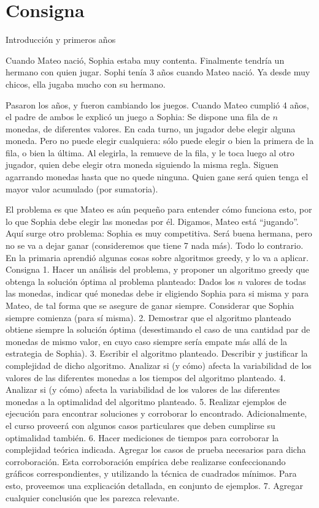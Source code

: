 \section*{Consigna}


{\huge Introducción y primeros años}
\vskip0.5cm

Cuando Mateo nació, Sophia estaba muy contenta. Finalmente tendría un hermano con quien jugar. Sophi tenía 3 años cuando Mateo nació. Ya desde muy chicos, ella jugaba mucho con su hermano.

Pasaron los años, y fueron cambiando los juegos. Cuando Mateo cumplió 4 años, el padre de ambos le explicó un juego a Sophia: Se dispone una fila de $n$ monedas, de diferentes valores. En cada turno, un jugador debe elegir alguna moneda. Pero no puede elegir cualquiera: sólo puede elegir o bien la primera de la fila, o bien la última. Al elegirla, la remueve de la fila, y le toca luego al otro jugador, quien debe elegir otra moneda siguiendo la misma regla. Siguen agarrando monedas hasta que no quede ninguna. Quien gane será quien tenga el mayor valor acumulado (por sumatoria).

El problema es que Mateo es aún pequeño para entender cómo funciona esto, por lo que Sophia debe elegir las monedas por él. Digamos, Mateo está “jugando”. Aquí surge otro problema: Sophia es muy competitiva. Será buena hermana, pero no se va a dejar ganar (consideremos que tiene 7 nada más). Todo lo contrario. En la primaria aprendió algunas cosas sobre algoritmos greedy, y lo va a aplicar.
\vskip0.5cm
{\huge Consigna}
\vskip0.5cm
1. Hacer un análisis del problema, y proponer un algoritmo greedy que obtenga la solución óptima al problema planteado: Dados los 
$n$ valores de todas las monedas, indicar qué monedas debe ir eligiendo Sophia para si misma y para Mateo, de tal forma que se asegure de ganar siempre. Considerar que Sophia siempre comienza (para sí misma).
\vskip0.3cm
2. Demostrar que el algoritmo planteado obtiene siempre la solución óptima (desestimando el caso de una cantidad par de monedas de mismo valor, en cuyo caso siempre sería empate más allá de la estrategia de Sophia).
\vskip0.3cm
3. Escribir el algoritmo planteado. Describir y justificar la complejidad de dicho algoritmo. Analizar si (y cómo) afecta la variabilidad de los valores de las diferentes monedas a los tiempos del algoritmo planteado.
\vskip0.3cm
4. Analizar si (y cómo) afecta la variabilidad de los valores de las diferentes monedas a la optimalidad del algoritmo planteado.
\vskip0.3cm
5. Realizar ejemplos de ejecución para encontrar soluciones y corroborar lo encontrado. Adicionalmente, el curso proveerá con algunos casos particulares que deben cumplirse su optimalidad también.
\vskip0.3cm
6. Hacer mediciones de tiempos para corroborar la complejidad teórica indicada. Agregar los casos de prueba necesarios para dicha corroboración. Esta corroboración empírica debe realizarse confeccionando gráficos correspondientes, y utilizando la técnica de cuadrados mínimos. Para esto, proveemos una explicación detallada, en conjunto de ejemplos.
\vskip0.3cm
7. Agregar cualquier conclusión que les parezca relevante.

